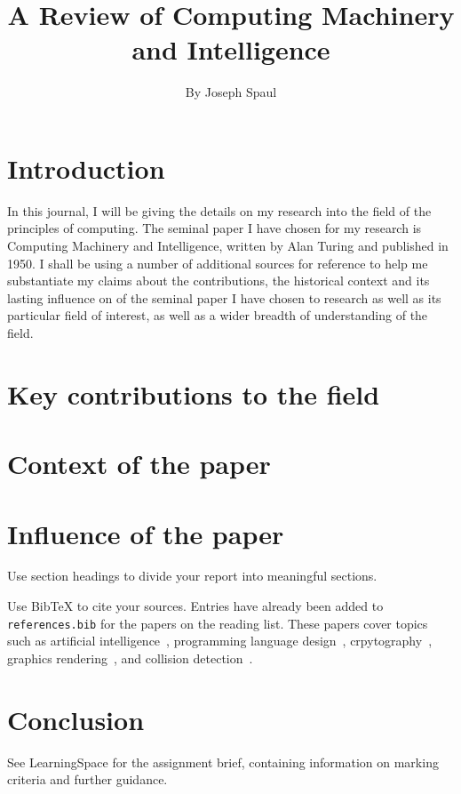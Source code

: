\documentclass{article}
\title{A Review of Computing Machinery and Intelligence}
\author{By Joseph Spaul}
\begin{document}
\maketitle

\section{Introduction}

In this journal, I will be giving the details on my research into the field of the principles of computing. 
The seminal paper I have chosen for my research is Computing Machinery and Intelligence, written by Alan Turing 
and published in 1950. I shall be using a number of additional sources for reference to help me substantiate my 
claims about the contributions, the historical context and its lasting influence on of the seminal paper I have 
chosen to research as well as its particular field of interest, as well as a wider breadth of understanding of 
the field.

\section{Key contributions to the field}

\section{Context of the paper}

\section{Influence of the paper}

Use section headings to divide your report into meaningful sections.

Use BibTeX to cite your sources. Entries have already been added to \texttt{references.bib} for the papers on the reading list.
These papers cover topics such as artificial intelligence~\cite{turing1950_intelligence, knuth1975_alphabeta}, programming language design~\cite{dijkstra1968_goto}, crpytography~\cite{rivest1978_rsa}, graphics rendering~\cite{phong1975_illumination}, and collision detection~\cite{gilbert1988_gjk}.

\section{Conclusion}

See LearningSpace for the assignment brief, containing information on marking criteria and further guidance.
\end{document}

